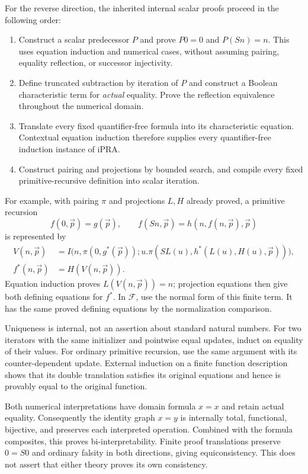 \documentclass[11pt,letterpaper]{article}
\theoremstyle{definition}
\theoremstyle{remark}
\begin{document}
For the reverse direction, the inherited internal scalar proofs proceed
in the following order:
\begin{enumerate}
\item Construct a scalar predecessor $P$ and prove $P0=0$ and $P(Sn)=n$.
This uses equation induction and numerical cases, without assuming
pairing, equality reflection, or successor injectivity.
\item Define truncated subtraction by iteration of $P$ and construct a
Boolean characteristic term for \emph{actual} equality. Prove the
reflection equivalence throughout the numerical domain.
\item Translate every fixed quantifier-free formula into its
characteristic equation. Contextual equation induction therefore
supplies every quantifier-free induction instance of iPRA.
\item Construct pairing and projections by bounded search, and compile
every fixed primitive-recursive definition into scalar iteration.
\end{enumerate}

For example, with pairing $\pi$ and projections $L,H$ already proved,
a primitive recursion
\[
 f(0,\vec p)=g(\vec p),\qquad
 f(Sn,\vec p)=h(n,f(n,\vec p),\vec p)
\]
is represented by
\[
\begin{aligned}
 V(n,\vec p)&=
 I\bigl(n,\pi(0,g^*(\vec p));
 u.\pi(SL(u),h^*(L(u),H(u),\vec p))\bigr),\\
 f^*(n,\vec p)&=H(V(n,\vec p)).
\end{aligned}
\]
Equation induction proves $L(V(n,\vec p))=n$; projection equations
then give both defining equations for $f^*$. In $\mathcal F$, use
the normal form of this finite term. It has the same proved
defining equations by the normalization comparison.

Uniqueness is internal, not an assertion about standard natural numbers.
For two iterators with the same initializer and pointwise equal updates,
induct on equality of their values. For ordinary primitive recursion,
use the same argument with its counter-dependent update. External
induction on a finite function description shows that its double
translation satisfies its original equations and hence is provably
equal to the original function.

Both numerical interpretations have domain formula $x=x$ and retain
actual equality. Consequently the identity graph $x=y$ is internally
total, functional, bijective, and preserves each interpreted operation.
Combined with the formula composites, this proves bi-interpretability.
Finite proof translations preserve $0=S0$ and ordinary falsity in both
directions, giving equiconsistency. This does not assert that either
theory proves its own consistency.
\end{document}
